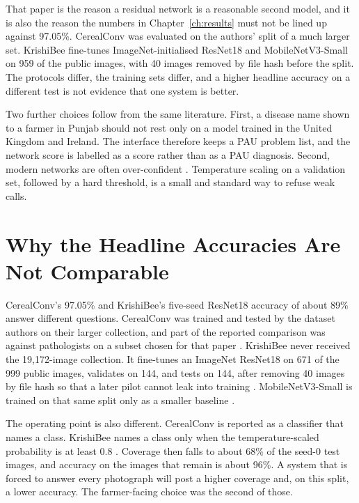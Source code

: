 That paper is the reason a residual network is a reasonable second model, and it is also the reason the numbers in Chapter~\ref{ch:results} must not be lined up against 97.05\%. CerealConv was evaluated on the authors' split of a much larger set. KrishiBee fine-tunes ImageNet-initialised ResNet18 and MobileNetV3-Small \cite{he2016resnet,howard2019mobilenetv3} on 959 of the public images, with 40 images removed by file hash before the split. The protocols differ, the training sets differ, and a higher headline accuracy on a different test is not evidence that one system is better.

Two further choices follow from the same literature. First, a disease name shown to a farmer in Punjab should not rest only on a model trained in the United Kingdom and Ireland. The interface therefore keeps a PAU problem list, and the network score is labelled as a score rather than as a PAU diagnosis. Second, modern networks are often over-confident \cite{guo2017calibration}. Temperature scaling on a validation set, followed by a hard threshold, is a small and standard way to refuse weak calls.

\section{Why the Headline Accuracies Are Not Comparable}
CerealConv's 97.05\% and KrishiBee's five-seed ResNet18 accuracy of about 89\% answer different questions. CerealConv was trained and tested by the dataset authors on their larger collection, and part of the reported comparison was against pathologists on a subset chosen for that paper \cite{long2023wheat}. KrishiBee never received the 19{,}172-image collection. It fine-tunes an ImageNet ResNet18 on 671 of the 999 public images, validates on 144, and tests on 144, after removing 40 images by file hash so that a later pilot cannot leak into training \cite{long2023data}. MobileNetV3-Small is trained on that same split only as a smaller baseline \cite{howard2019mobilenetv3}.

The operating point is also different. CerealConv is reported as a classifier that names a class. KrishiBee names a class only when the temperature-scaled probability is at least 0.8 \cite{guo2017calibration}. Coverage then falls to about 68\% of the seed-0 test images, and accuracy on the images that remain is about 96\%. A system that is forced to answer every photograph will post a higher coverage and, on this split, a lower accuracy. The farmer-facing choice was the second of those.

